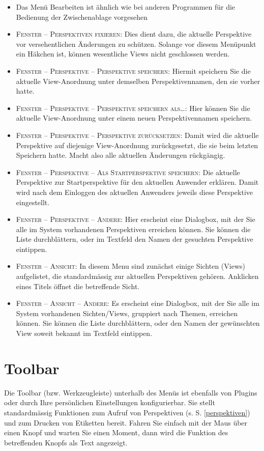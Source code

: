 \begin{itemize}
{  sein.}
  \item {Das Menü \glqq Bearbeiten\grqq{} ist ähnlich wie bei anderen Programmen
  für die Bedienung der Zwischenablage vorgesehen}
  \item {\textsc{Fenster -- Perspektiven fixieren}: Dies dient dazu, die
  aktuelle Perspektive vor versehentlichen Änderungen zu schützen. Solange vor
  diesem Menüpunkt ein Häkchen ist, können wesentliche Views nicht geschlossen
  werden.}
  \item {\textsc{Fenster -- Perspektive -- Perspektive speichern}: Hiermit
  speichern Sie die aktuelle View-Anordnung unter demselben Perspektivennamen,
  den sie vorher hatte.}
  \item {\textsc{Fenster -- Perspektive -- Perspektive speichern als\ldots}:
  Hier können Sie die aktuelle View-Anordnung unter einem neuen
  Perspektivennamen speichern.}
  \item {\textsc{Fenster -- Perspektive -- Perspektive zurücksetzen}: Damit wird
  die aktuelle Perspektive auf diejenige View-Anordnung zurückgesetzt, die sie
  beim letzten Speichern hatte. Macht also alle aktuellen Änderungen
  rückgängig.}
  \item {\textsc{Fenster -- Perspektive -- Als Startperspektive speichern}: Die
  aktuelle Perspektive zur Startperspektive für den aktuellen Anwender erklären.
  Damit wird nach dem Einloggen des aktuellen Anwenders jeweils diese
  Perspektive eingestellt.}
  \item {\textsc{Fenster -- Perspektive -- Andere}: Hier erscheint eine
  Dialogbox, mit der Sie alle im System vorhandenen Perspektiven erreichen
  können. Sie können die Liste durchblättern, oder im Textfeld den Namen der
  gesuchten Perspektive eintippen.}
  \item {\textsc{Fenster -- Ansicht}: In diesem Menu sind zunächst einige
  Sichten (Views) aufgelistet, die standardmässig zur aktuellen Perspektiven
  gehören. Anklicken eines Titels öffnet die betreffende Sicht.}
  \item {\textsc{Fenster -- Ansicht -- Andere}: Es erscheint eine Dialogbox, mit
  der Sie alle im System vorhandenen Sichten/Views, gruppiert nach Themen, erreichen
  können. Sie können die Liste durchblättern, oder den Namen der gewünschten
  View soweit bekannt im Textfeld eintippen.}
\end{itemize}

\section{Toolbar}
Die Toolbar (bzw. Werkzeugleiste) unterhalb des Menüs ist ebenfalls von Plugins
oder durch Ihre persönlichen Einstellungen konfigurierbar. Sie stellt
standardmässig Funktionen zum Aufruf von Perspektiven (s. S. \ref{perspektiven})
und zum Drucken von Etiketten bereit. Fahren Sie einfach mit der Maus über einen Knopf und warten Sie einen Moment, dann wird die Funktion des betreffenden Knopfs als Text angezeigt. 